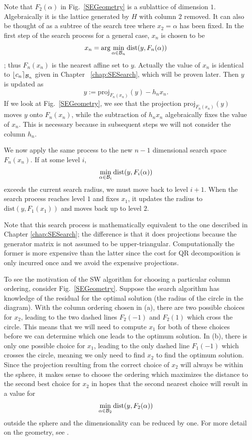 \documentclass[12pt,Bold,letterpaper]{mcgilletdclass}
\newcommand{\dist}{\mathrm{dist}}
\begin{document}
Note that $F_2(\alpha)$ in Fig.\ \ref{SEGeometry} is a sublattice of dimension $1$.  
Algebraically it is the lattice generated by $H$ with column
$2$ removed. It can also be thought of as a subtree of the search tree where
$x_2 = \alpha$ has been fixed. 
In the first step of the search process for a general case,   $x_n$ is chosen to be
$$x_n=\arg\min_{\alpha\in {\cal B}_n}\dist(y,F_n(\alpha))$$; thus $F_n(x_n)$ is the nearest affine set to $y$. 
Actually the value of $x_n$ is identical to $\lfloor c_n \rceil_{{\cal B}_n}$ given in Chapter ~\ref{chap:SESearch},
which will be proven later.
Then  $y$ is updated  as $$y := \mbox{proj}_{F_n(x_n)}(y) - h_nx_n.$$ If we look
at Fig.\ \ref{SEGeometry}, we see that the projection $\mbox{proj}_{F_n(x_n)}(y)$ moves $y$ onto $F_n(x_n)$, while the subtraction of $h_nx_n$ algebraically fixes the value of $x_n$. This is necessary because in subsequent steps we will not consider the column $h_n$.

We now apply the same process to the new $n-1$ dimensional search space
$F_n(x_n)$. If at some level $i$, $$\min_{\alpha\in {\cal B}_i}\dist(y,F_i(\alpha))$$ exceeds the current
search radius, we must move back to level $i+1$. %
When the search process reaches level $1$ and fixes $x_1$, it updates the radius to  
$\dist(y,F_1(x_1))$ and moves back up to level $2$.

Note that this search process is mathematically equivalent to the one described in Chapter
\ref{chap:SESearch}; the difference is that it  does projections
because  the generator matrix is not assumed to be upper-triangular. 
Computationally the former is more expensive than the latter since the cost for QR decomposition is only incurred once and we avoid the expensive projections.

To see the motivation of the SW algorithm for choosing a particular column ordering,
consider Fig.\ \ref{SEGeometry}. Suppose the search algorithm has knowledge of
the residual for the optimal solution (the radius of the circle in the diagram).
With the column ordering chosen in (a), there are two possible choices for $x_2$,
leading to the two dashed lines $F_2(-1)$ and $F_2(1)$ which cross the circle. This means
that we will need to compute $x_1$ for both of these choices
before we can determine which one leads to the optimum solution. In (b), there
is only one possible choice for $x_1$,  leading to the only dashed line $F_1(-1)$
which crosses the circle, meaning we only need to find $x_2$ to find the optimum solution.
Since the projection resulting from the correct choice of $x_2$ will always be
within the sphere, it makes sense to choose the ordering which maximizes the
distance to the second best choice for $x_2$ in hopes that the second nearest
choice will result in a value for $$\min_{\alpha\in {\cal B}_2}\dist(y,F_2(\alpha))$$ outside the sphere and the
dimensionality can be reduced by one. 
For more detail on the geometry, see  \cite{SuW05}.
\end{document}
